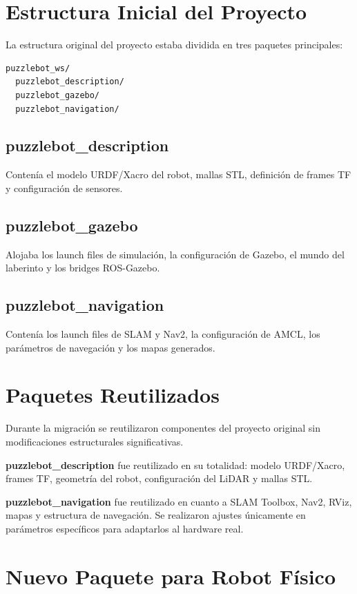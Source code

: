 \documentclass[conference]{IEEEtran}
\begin{document}
\section{Estructura Inicial del Proyecto}

La estructura original del proyecto estaba dividida en tres paquetes principales:

\begin{lstlisting}
puzzlebot_ws/
  puzzlebot_description/
  puzzlebot_gazebo/
  puzzlebot_navigation/
\end{lstlisting}

\subsection{puzzlebot\_description}
Contenía el modelo URDF/Xacro del robot, mallas STL, definición de frames TF
y configuración de sensores.

\subsection{puzzlebot\_gazebo}
Alojaba los launch files de simulación, la configuración de Gazebo, el mundo
del laberinto y los bridges ROS-Gazebo.

\subsection{puzzlebot\_navigation}
Contenía los launch files de SLAM y Nav2, la configuración de AMCL, los
parámetros de navegación y los mapas generados.

\section{Paquetes Reutilizados}

Durante la migración se reutilizaron componentes del proyecto original sin
modificaciones estructurales significativas.

\textbf{puzzlebot\_description} fue reutilizado en su totalidad: modelo
URDF/Xacro, frames TF, geometría del robot, configuración del LiDAR y mallas STL.

\textbf{puzzlebot\_navigation} fue reutilizado en cuanto a SLAM Toolbox, Nav2,
RViz, mapas y estructura de navegación. Se realizaron ajustes únicamente en
parámetros específicos para adaptarlos al hardware real.

\section{Nuevo Paquete para Robot Físico}
\end{document}
